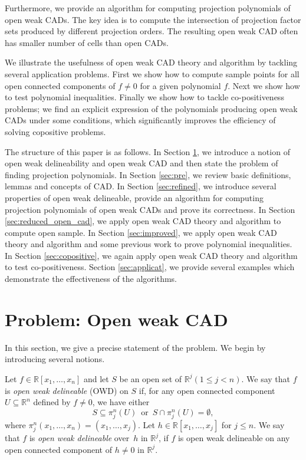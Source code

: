 \documentclass[amsthm]{elsart}
\def \RR {{\mathbb R}}
\begin{document}
Furthermore, we  provide an algorithm for computing projection polynomials of open weak CADs. The key idea is to compute the intersection of projection factor sets produced by different projection orders. The resulting open weak CAD often has smaller number of cells than open CADs.



We illustrate the usefulness of open weak CAD theory and algorithm by tackling several application problems. First we show how to compute sample points for all open connected components of $ f\ne 0$ for a given polynomial $f$. Next we show how to test polynomial inequalities. Finally we  show how to tackle  co-positiveness problems; we find an explicit expression of the polynomials producing open weak CADs under some conditions, which significantly improves the efficiency of solving copositive problems.








The structure of this paper is as follows. In Section \ref{sec:problem}, we introduce a notion of  open weak delineability  and open weak CAD and then state the problem of finding projection polynomials. In Section \ref{sec:pre}, we review basic definitions, lemmas and concepts of CAD. In Section \ref{sec:refined}, we introduce several properties of open weak delineable, provide an algorithm for computing projection polynomials of open weak CADs  and prove its correctness. In Section \ref{sec:reduced_open_cad}, we apply open weak CAD theory and algorithm to  compute open sample. In Section \ref{sec:improved}, we apply open weak CAD theory and algorithm and some previous work \citep{han2016proving} to prove  polynomial inequalities.    In Section \ref{sec:copositive}, we again  apply open weak CAD theory and algorithm to  test co-positiveness. Section \ref{sec:applicat}, we provide  several examples which demonstrate the effectiveness of the algorithms. 



 \section{Problem: Open weak CAD}\label{sec:problem}



 In this section, we give a precise statement of the problem.  We begin by  introducing several notions.

 \begin{defn} \label{def:weakopendeli}
Let  $f\in \RR[x_1,\ldots,x_n]$ and let $S$ be an open set of $\RR^j (1\le j< n)$. We say that $f$ is  {\em open weak delineable} (OWD) on $S$ if, for any open connected component $U\subseteq \RR^n$ defined by $f\neq0$, we have either
$$S\subseteq \pi_j^n(U)  \,\,\,\text{or}\,\,\, S\cap \pi_j^n(U)=\emptyset,$$
where $\pi_j^n(x_1,\ldots,x_n)=(x_1,\ldots,x_j)$.
Let $h\in \RR[x_1,\ldots,x_j]$ for $j\le n.$ We say
that $f$ is {\em open weak delineable\/} over~$h$ in $\RR^j$, if $f$ is open weak delineable on any open connected component of $h\neq0$ in $\RR^j$.
\end{defn}
\end{document}
